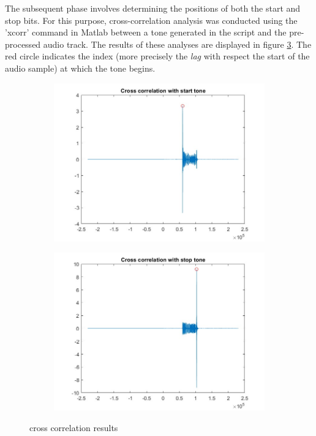 The subsequent phase involves determining the positions of both the start and stop bits. For this purpose, cross-correlation analysis was conducted using the 'xcorr' command in Matlab between a tone generated in the script and the pre-processed audio track. The results of these analyses are displayed in figure \ref{fig:tonesearch}. The red circle indicates the index (more precisely the \textit{lag} with respect the start of the audio sample) at which the tone begins.

\begin{figure}[H]
    \centering
    \begin{subfigure}{0.48\textwidth}
    \includegraphics[width=\textwidth]{LiveAudioWatermarking/images/cross_start.jpg}
    \caption{}
    \label{}
    \end{subfigure}%
    \hfill
     \begin{subfigure}{0.48\textwidth}
    \includegraphics[width=\textwidth]{LiveAudioWatermarking/images/cross_stop.jpg}
    \caption{}
    \label{}
    \end{subfigure}
    \caption{cross correlation results}
    \label{fig:tonesearch}
\end{figure}

